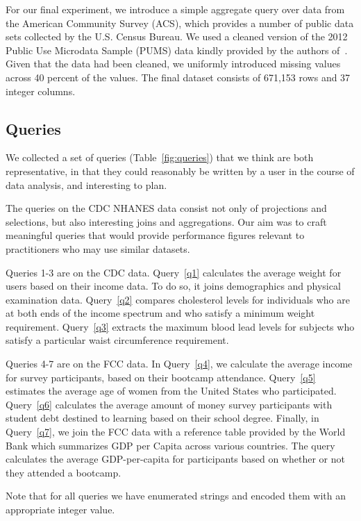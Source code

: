 For our final experiment, we introduce a simple aggregate query over data from the American Community Survey (ACS), which
provides a number of public data sets collected by the U.S. Census Bureau.
We used a cleaned version of the 2012 Public Use Microdata Sample (PUMS) data kindly provided by the authors of~\cite{akande2015empirical}.
Given that the data had been cleaned, we uniformly introduced missing values across 40 percent of the values. The final dataset consists
of 671,153 rows and 37 integer columns.

\subsection{Queries}
We collected a set of queries (Table~\ref{fig:queries}) that we think are both representative, in that they could reasonably be written by a user in the course of data analysis, and interesting to plan.

The queries on the CDC NHANES data consist not only of projections and selections,
but also interesting joins and aggregations. Our aim was to craft meaningful queries
that would provide performance figures relevant to practitioners who may use
similar datasets.

Queries 1-3 are on the CDC data. Query~\ref{q1} calculates the average weight for users based on their income data.
To do so, it joins demographics and physical examination data. Query~\ref{q2}
compares cholesterol levels for individuals who are at both ends of the income
spectrum and who satisfy a minimum weight requirement. Query~\ref{q3}
extracts the maximum blood lead levels for subjects who satisfy a particular
waist circumference requirement.

Queries 4-7 are on the FCC data. In Query~\ref{q4}, we calculate the average income for survey participants,
based on their bootcamp attendance. Query~\ref{q5} estimates the average
age of women from the United States who participated. Query~\ref{q6} 
calculates the average amount of money survey participants with student debt destined to
learning based on their school degree. Finally, in Query~\ref{q7}, we join the FCC data with a reference table provided
by the World Bank which summarizes GDP per Capita across various
countries\cite{worldbank-data}. The query calculates the average GDP-per-capita for participants based on whether or not they
attended a bootcamp. 

Note that for all queries we have enumerated strings and encoded them with
an appropriate integer value.

